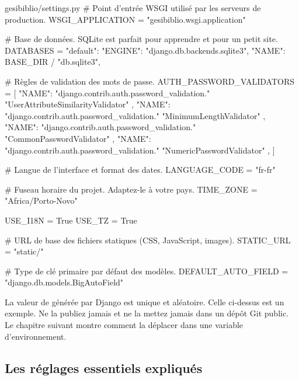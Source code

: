 \begin{codebox}[python]{gesibiblio/settings.py}
# Point d'entrée WSGI utilisé par les serveurs de production.
WSGI_APPLICATION = "gesibiblio.wsgi.application"

# Base de données. SQLite est parfait pour apprendre et pour un petit site.
DATABASES = {
    "default": {
        "ENGINE": "django.db.backends.sqlite3",
        "NAME": BASE_DIR / "db.sqlite3",
    }
}

# Règles de validation des mots de passe.
AUTH_PASSWORD_VALIDATORS = [
    {
        "NAME": "django.contrib.auth.password_validation."
                "UserAttributeSimilarityValidator"
    },
    {
        "NAME": "django.contrib.auth.password_validation."
                "MinimumLengthValidator"
    },
    {
        "NAME": "django.contrib.auth.password_validation."
                "CommonPasswordValidator"
    },
    {
        "NAME": "django.contrib.auth.password_validation."
                "NumericPasswordValidator"
    },
]

# Langue de l'interface et format des dates.
LANGUAGE_CODE = "fr-fr"

# Fuseau horaire du projet. Adaptez-le à votre pays.
TIME_ZONE = "Africa/Porto-Novo"

USE_I18N = True
USE_TZ = True

# URL de base des fichiers statiques (CSS, JavaScript, images).
STATIC_URL = "static/"

# Type de clé primaire par défaut des modèles.
DEFAULT_AUTO_FIELD = "django.db.models.BigAutoField"
\end{codebox}

\begin{note}
La valeur de  générée par Django est unique et aléatoire. Celle
ci-dessus est un exemple. Ne la publiez jamais et ne la mettez jamais dans un
dépôt Git public. Le chapitre suivant montre comment la déplacer dans une variable
d'environnement.
\end{note}

\subsection{Les réglages essentiels expliqués}

